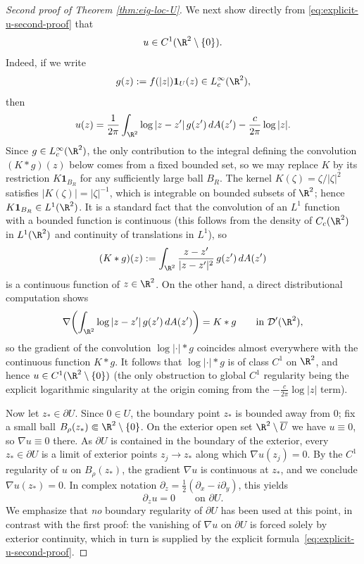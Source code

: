 \begin{proof}[Second proof of Theorem \ref{thm:eig-loc-U}]
We next show directly from \eqref{eq:explicit-u-second-proof} that
\[
u\in C^1(\R^2\setminus\{0\}).
\]
Indeed, if we write
\[
g(z):=f(|z|)\mathbf{1}_U(z)\in L^\infty_c(\R^2),
\]
then
\[
u(z)=\frac{1}{2\pi}\int_{\R^2}\log|z-z'|\,g(z')\,dA(z')-\frac{c}{2\pi}\log|z|.
\]
Since \(g\in L^\infty_c(\R^2)\), the only contribution to the integral defining the convolution
\((K\ast g)(z)\) below comes from a fixed bounded set, so we may replace \(K\) by its restriction
\(K\mathbf{1}_{B_R}\) for any sufficiently large ball \(B_R\). The kernel
\(K(\zeta)=\zeta/|\zeta|^2\) satisfies \(|K(\zeta)|=|\zeta|^{-1}\), which is integrable on bounded
subsets of \(\R^2\); hence \(K\mathbf{1}_{B_R}\in L^1(\R^2)\). It is a standard fact
that the convolution of an \(L^1\) function with a bounded function is continuous
(this follows from the density of \(C_c(\R^2)\) in \(L^1(\R^2)\) and continuity of translations in
\(L^1\)), so
\[
(K\ast g)(z):=\int_{\R^2}\frac{z-z'}{|z-z'|^2}\,g(z')\,dA(z')
\]
is a continuous function of \(z\in\R^2\). On the other hand, a direct distributional computation
shows
\[
\nabla\!\left(\int_{\R^2}\log|z-z'|\,g(z')\,dA(z')\right)=K\ast g
\qquad\text{in }\mathcal D'(\R^2),
\]
so the gradient of the convolution \(\log|\cdot|\ast g\) coincides almost everywhere with the
continuous function \(K\ast g\). It follows that \(\log|\cdot|\ast g\) is of class \(C^1\) on
\(\R^2\), and hence \(u\in C^1(\R^2\setminus\{0\})\) (the only obstruction to global \(C^1\)
regularity being the explicit logarithmic singularity at the origin coming from the
\(-\frac{c}{2\pi}\log|z|\) term).

Now let \(z_*\in\partial U\). Since \(0\in U\), the boundary point \(z_*\) is bounded away from
\(0\); fix a small ball \(B_\rho(z_*)\Subset \R^2\setminus\{0\}\). On the exterior open set
\(\R^2\setminus \overline U\) we have \(u\equiv 0\), so \(\nabla u\equiv 0\) there. As
\(\partial U\) is contained in the boundary of the exterior, every \(z_*\in\partial U\) is a limit
of exterior points \(z_j\to z_*\) along which \(\nabla u(z_j)=0\). By the \(C^1\) regularity of
\(u\) on \(B_\rho(z_*)\), the gradient \(\nabla u\) is continuous at \(z_*\), and we conclude
\(\nabla u(z_*)=0\). In complex notation \(\partial_z=\tfrac{1}{2}(\partial_x-i\partial_y)\), this
yields
\begin{equation}\label{eq:dz-zero-second-proof}
\partial_z u=0
\qquad\text{on }\partial U.
\end{equation}
We emphasize that \emph{no} boundary regularity of \(\partial U\) has been used at this point, in
contrast with the first proof: the vanishing of \(\nabla u\) on \(\partial U\) is forced solely by
exterior continuity, which in turn is supplied by the explicit
formula~\eqref{eq:explicit-u-second-proof}.


\end{proof}
